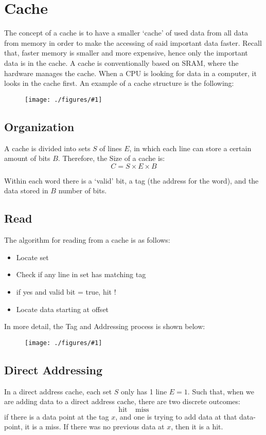 \documentclass[12pt]{book}
\title{\coursetitle\linebreak\lecturename}
\author{\\Cain Susko\\ 
           \\ \\ \\
      Queen's University 
    \\School of Computing\\}
\newcommand{\incimg}[2]{%
       \begin{figure}[h]
               \centering
               \texttt{[image: ./figures/\#1]}
       \end{figure}
}
\begin{document}
\begin{titlepage}
        \maketitle
\end{titlepage}


\section*{Cache}
The concept of a cache is to have a smaller `cache' of used data from all data from memory in order to make the 
accessing of said important data faster. Recall that, faster memory is smaller and more expensive, hence only the important
data is in the cache. A cache is conventionally based on SRAM, where the hardware manages the cache. When a CPU is looking
for data in a computer, it looks in the cache first. An example of a cache structure is the following:
\incimg{cacheStruc}{0.5}

\subsection*{Organization}
A cache is divided into sets $S$ of lines $E$, in which each line can store a certain amount of bits $B$. Therefore, the Size of 
a cache is:
\[C = S \times E \times B\]

Within each word there is a `valid' bit, a tag (the address for the word), and the data stored in $B$ number of bits.

\subsection*{Read}
The algorithm for reading from a cache is as follows:
\begin{itemize}
        \item Locate set
        \item Check if any line in set has matching tag
        \item if yes and valid bit = true, hit !
        \item Locate data starting at offset
\end{itemize}
\pagebreak

In more detail, the Tag and Addressing process is shown below:
\incimg{readCache}{0.3}

\subsection*{Direct Addressing}
In a direct address cache, each set $S$ only has 1 line $E=1$.
Such that, when we are adding data to a direct address cache, there are two discrete outcomes:
\[\text{hit}\;\;\;\;\text{miss}\]
if there is a data point at the tag $x$, and one is trying to add data at that data-point, it is a miss. If
there was no previous data at $x$, then it is a hit.
\end{document}
